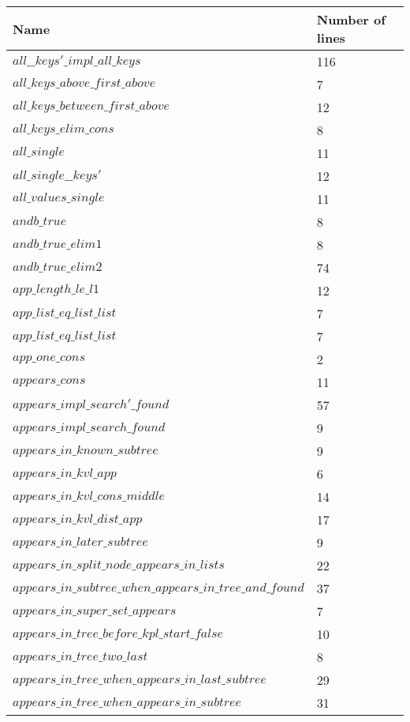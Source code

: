 \begin{tabular}{| l | l |}
\hline
Name & Number of lines \\ \hline
$all\_\_keys'\_impl\_all\_keys$ & 116 \\ \hline
$all\_keys\_above\_first\_above$ & 7 \\ \hline
$all\_keys\_between\_first\_above$ & 12 \\ \hline
$all\_keys\_elim\_cons$ & 8 \\ \hline
$all\_single$ & 11 \\ \hline
$all\_single\_\_keys'$ & 12 \\ \hline
$all\_values\_single$ & 11 \\ \hline
$andb\_true$ & 8 \\ \hline
$andb\_true\_elim1$ & 8 \\ \hline
$andb\_true\_elim2$ & 74 \\ \hline
$app\_length\_le\_l1$ & 12 \\ \hline
$app\_list\_eq\_list\_list$ & 7 \\ \hline
$app\_list\_eq\_list\_list$ & 7 \\ \hline
$app\_one\_cons$ & 2 \\ \hline
$appears\_cons$ & 11 \\ \hline
$appears\_impl\_search'\_found$ & 57 \\ \hline
$appears\_impl\_search\_found$ & 9 \\ \hline
$appears\_in\_known\_subtree$ & 9 \\ \hline
$appears\_in\_kvl\_app$ & 6 \\ \hline
$appears\_in\_kvl\_cons\_middle$ & 14 \\ \hline
$appears\_in\_kvl\_dist\_app$ & 17 \\ \hline
$appears\_in\_later\_subtree$ & 9 \\ \hline
$appears\_in\_split\_node\_appears\_in\_lists$ & 22 \\ \hline
$appears\_in\_subtree\_when\_appears\_in\_tree\_and\_found$ & 37 \\ \hline
$appears\_in\_super\_set\_appears$ & 7 \\ \hline
$appears\_in\_tree\_before\_kpl\_start\_false$ & 10 \\ \hline
$appears\_in\_tree\_two\_last$ & 8 \\ \hline
$appears\_in\_tree\_when\_appears\_in\_last\_subtree$ & 29 \\ \hline
$appears\_in\_tree\_when\_appears\_in\_subtree$ & 31 \\ \hline

\end{tabular}
